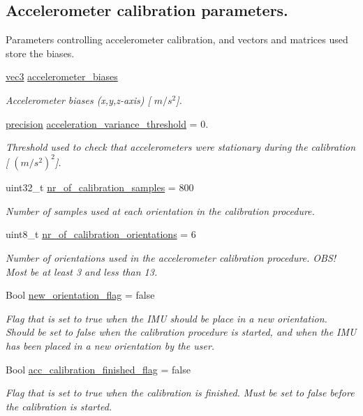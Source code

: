 \subsection*{\-Accelerometer calibration parameters.}
\label{_amgrp498a39b5e61b8b18fd67982a4b1746b8}%
 \-Parameters controlling accelerometer calibration, and vectors and matrices used store the biases. \begin{DoxyCompactItemize}
\item 
\hyperlink{nav__types_8h_a90c683614d896321009d3b3c401b764f}{vec3} \hyperlink{group__nav__eq_ga1089eea940f41eff26a6cba1172089e9}{accelerometer\-\_\-biases}
\begin{DoxyCompactList}\small\item\em \-Accelerometer biases (x,y,z-\/axis) \mbox{[} $m/s^2$\mbox{]}. \end{DoxyCompactList}\item 
\hyperlink{nav__types_8h_a37e1884b1f06826c49607cec459b4e8a}{precision} \hyperlink{group__nav__eq_gad5049be4d6ed3b9f92063c6ca6413b46}{acceleration\-\_\-variance\-\_\-threshold} = 0.
\begin{DoxyCompactList}\small\item\em \-Threshold used to check that accelerometers were stationary during the calibration \mbox{[} $(m/s^2)^2$\mbox{]}. \end{DoxyCompactList}\item 
uint32\-\_\-t \hyperlink{group__nav__eq_gab9d05ce5927a225127eff6993856da19}{nr\-\_\-of\-\_\-calibration\-\_\-samples} = 800
\begin{DoxyCompactList}\small\item\em \-Number of samples used at each orientation in the calibration procedure. \end{DoxyCompactList}\item 
uint8\-\_\-t \hyperlink{group__nav__eq_ga642a3ad33a0242f4e12fe46a13b0303f}{nr\-\_\-of\-\_\-calibration\-\_\-orientations} = 6
\begin{DoxyCompactList}\small\item\em \-Number of orientations used in the accelerometer calibration procedure. \-O\-B\-S! \-Most be at least 3 and less than 13. \end{DoxyCompactList}\item 
\-Bool \hyperlink{group__nav__eq_ga9340627920ea2445fe1469547bc64eae}{new\-\_\-orientation\-\_\-flag} = false
\begin{DoxyCompactList}\small\item\em \-Flag that is set to true when the \-I\-M\-U should be place in a new orientation. \-Should be set to false when the calibration procedure is started, and when the \-I\-M\-U has been placed in a new orientation by the user. \end{DoxyCompactList}\item 
\-Bool \hyperlink{group__nav__eq_gaa3b35b0b909a9a4b40d82658fab54349}{acc\-\_\-calibration\-\_\-finished\-\_\-flag} = false
\begin{DoxyCompactList}\small\item\em \-Flag that is set to true when the calibration is finished. \-Must be set to false before the calibration is started. \end{DoxyCompactList}\end{DoxyCompactItemize}
